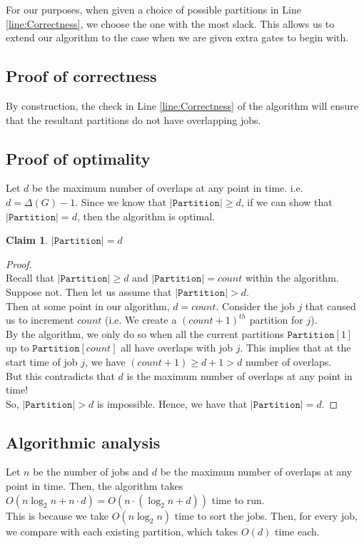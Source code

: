 \documentclass[12pt, a4paper]{report}
\newtheorem{claim}{Claim}
\begin{document}
For our purposes, when given a choice of possible partitions in Line \ref{line:Correctness}, we choose the one with the most slack. This allows us to extend our algorithm to the case when we are given extra gates to begin with.

\subsection{Proof of correctness}
By construction, the check in Line \ref{line:Correctness} of the algorithm will ensure that the resultant partitions do not have overlapping jobs.

\subsection{Proof of optimality}
Let $d$ be the maximum number of overlaps at any point in time. i.e. $d = \Delta(G) - 1$. Since we know that $\vert \texttt{Partition} \vert \geq d$, if we can show that $\vert \texttt{Partition} \vert = d$, then the algorithm is optimal.

\hspace{0pt}
\begin{claim}
$\vert \texttt{Partition} \vert = d$
\end{claim}
\begin{proof}\hspace{0pt}\\
Recall that $\vert \texttt{Partition} \vert \geq d$ and $\vert \texttt{Partition} \vert = count$ within the algorithm.\\
Suppose not. Then let us assume that $\vert \texttt{Partition} \vert > d$.\\
Then at some point in our algorithm, $d = count$. Consider the job $j$ that caused us to increment $count$ (i.e. We create a $(count + 1)^{th}$ partition for $j$).\\
By the algorithm, we only do so when all the current partitions $\texttt{Partition}[1]$ up to $\texttt{Partition}[count]$ all have overlaps with job $j$. This implies that at the start time of job $j$, we have $(count + 1) \geq d + 1 > d$ number of overlaps.\\
But this contradicts that $d$ is the maximum number of overlaps at any point in time!\\
So, $\vert \texttt{Partition} \vert > d$ is impossible. Hence, we have that $\vert \texttt{Partition} \vert = d$.
\end{proof}

\subsection{Algorithmic analysis}
Let $n$ be the number of jobs and $d$ be the maximum number of overlaps at any point in time. Then, the algorithm takes $O(n \log_2 n + n \cdot d) = O(n \cdot (\log_2 n + d))$ time to run.\\
This is because we take $O(n \log_2 n)$ time to sort the jobs. Then, for every job, we compare with each existing partition, which takes $O(d)$ time each.
\end{document}
